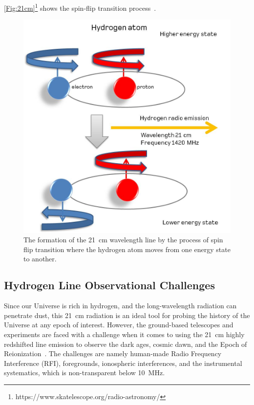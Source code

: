 \documentclass[12pt,a4paper]{report}
\begin{document}
	\autoref{Fig:21cm}\footnote{https://www.skatelescope.org/radio-astronomy/} shows the spin-flip transition process~\citep{16, book:832129}.
	
	\begin{figure}[htb!]
		\begin{center}
			\includegraphics[width=0.5\linewidth]{Figures/Hydrogenemission1.jpeg}
			\caption{The formation of the \SI{21}{cm} wavelength line by the process of spin flip transition where the hydrogen atom moves from one energy state to another.}
			\label{Fig:21cm}
		\end{center}
	\end{figure}
	
	
	\subsection{Hydrogen Line Observational Challenges}
	
	Since our Universe is rich in hydrogen, and the long-wavelength radiation can penetrate dust, this \SI{21}{cm} radiation is an ideal tool for probing the history of the Universe at any epoch of interest. However, the ground-based telescopes and experiments are faced with a challenge when it comes to using the \SI{21}{cm} highly redshifted line emission to observe the dark ages, cosmic dawn, and the Epoch of Reionization~\citep{2016ExA....41..271R}. The challenges are namely human-made Radio Frequency Interference (RFI), foregrounds, ionospheric interferences, and the instrumental systematics, which is non-transparent below \SI{10}{MHz}. 
	
\end{document}
